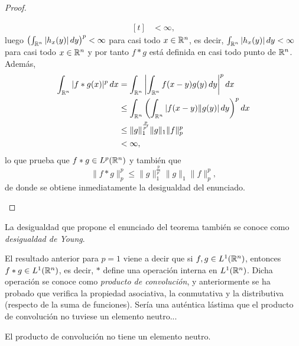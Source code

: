 \documentclass[a4paper, 11pt, oneside]{report}
\begin{document}
\begin{proof}
\begin{enumerate}
\[\begin{aligned}[t]
      &< \infty,
    \end{aligned}\]
    luego $\left(\int_{\mathbb R^n}|h_x(y)| \, dy\right)^p < \infty$ para casi todo $x \in \mathbb R^n$, es decir, $\int_{\mathbb R^n}|h_x(y)| \, dy < \infty$ para casi todo $x \in \mathbb R^n$ y por tanto $f\ast g$ está definida en casi todo punto de $\mathbb R^n$. Además,
    \[\begin{aligned}[t]
      \int_{\mathbb R^n} |f \ast g(x)|^p \, dx &= \int_{\mathbb R^n} \left|\int_{\mathbb R^n} f(x-y)g(y) \, dy\right|^p dx \\
      &\leq \int_{\mathbb R^n} \left(\int_{\mathbb R^n} |f(x-y)\|g(y)| \, dy\right)^p dx \\
      &\leq \|g\|_1^{\frac{p}{p'}}\|g\|_1\|f\|_p^p \\
      &< \infty,
    \end{aligned}\]
    lo que prueba que $f \ast g \in L^p(\mathbb R^n)$ y también que \[\|f \ast g\|_p^p \leq \|g\|_1^{\frac{p}{p'}} \|g\|_1\|f\|_p^p,\]
    de donde se obtiene inmediatamente la desigualdad del enunciado. \qedhere
  \end{enumerate}
\end{proof}

La desigualdad que propone el enunciado del teorema también se conoce como \emph{desigualdad de Young}. 

El resultado anterior para $p=1$ viene a decir que si $f,g \in L^1(\mathbb R^n)$, entonces $f \ast g \in L^1(\mathbb R^n)$, es decir, $\ast$ define una operación interna en $L^1(\mathbb R^n)$. Dicha operación se conoce como \emph{producto de convolución}, y anteriormente se ha probado que verifica la propiedad asociativa, la conmutativa y la distributiva (respecto de la suma de funciones). Sería una auténtica lástima que el producto de convolución no tuviese un elemento neutro...

\begin{proposition}
  El producto de convolución no tiene un elemento neutro.
\end{proposition}
\end{document}
